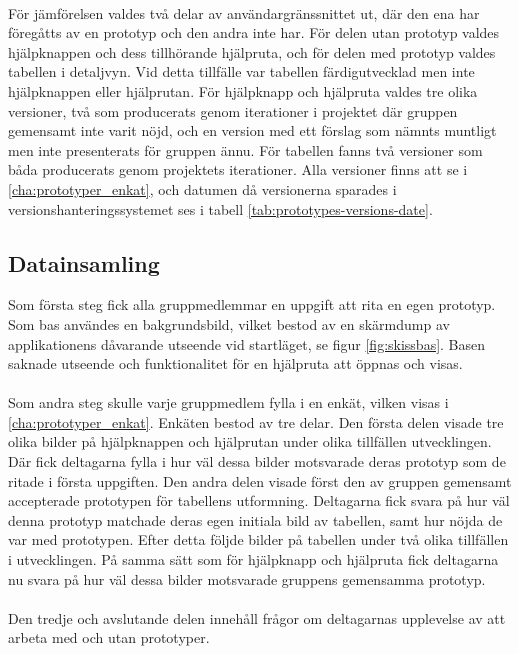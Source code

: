 \ \\
För jämförelsen valdes två delar av användargränssnittet ut, där den ena har föregåtts av en prototyp och den andra inte har. För delen utan prototyp valdes hjälpknappen och dess tillhörande hjälpruta, och för delen med prototyp valdes tabellen i detaljvyn. Vid detta tillfälle var tabellen färdigutvecklad men inte hjälpknappen eller hjälprutan. För hjälpknapp och hjälpruta valdes tre olika versioner, två som producerats genom iterationer i projektet där gruppen gemensamt inte varit nöjd, och en version med ett förslag som nämnts muntligt men inte presenterats för gruppen ännu. För tabellen fanns två versioner som båda producerats genom projektets iterationer. Alla versioner finns att se i \ref{cha:prototyper_enkat}, och datumen då versionerna sparades i versionshanteringssystemet ses i tabell \ref{tab:prototypes-versions-date}.

\subsection{Datainsamling}
Som första steg fick alla gruppmedlemmar en uppgift att rita en egen prototyp. Som bas användes en bakgrundsbild, vilket bestod av en skärmdump av applikationens dåvarande utseende vid startläget, se figur \ref{fig:skissbas}. Basen saknade utseende och funktionalitet för en hjälpruta att öppnas och visas.
\\ \\
Som andra steg skulle varje gruppmedlem fylla i en enkät, vilken visas i  \ref{cha:prototyper_enkat}. Enkäten bestod av tre delar. Den första delen visade tre olika bilder på hjälpknappen och hjälprutan under olika tillfällen utvecklingen. Där fick deltagarna fylla i hur väl dessa bilder motsvarade deras prototyp som de ritade i första uppgiften. 
Den andra delen visade först den av gruppen gemensamt accepterade prototypen för tabellens utformning. Deltagarna fick svara på hur väl denna prototyp matchade deras egen initiala bild av tabellen, samt hur nöjda de var med prototypen. Efter detta följde bilder på tabellen under två olika tillfällen i utvecklingen. På samma sätt som för hjälpknapp och hjälpruta fick deltagarna nu svara på hur väl dessa bilder motsvarade gruppens gemensamma prototyp.
\\ \\
Den tredje och avslutande delen innehåll frågor om deltagarnas upplevelse av att arbeta med och utan prototyper. 

